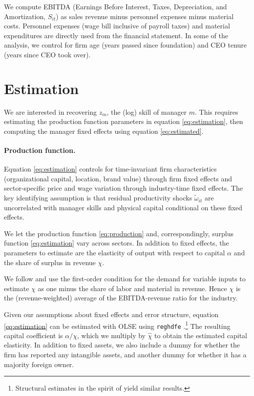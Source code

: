 \documentclass[11pt,a4paper]{article}
\begin{document}
We compute EBITDA (Earnings Before Interest, Taxes, Depreciation, and Amortization, $S_{it}$) as sales revenue minus personnel expenses minus material costs. Personnel expenses (wage bill inclusive of payroll taxes) and material expenditures are directly used from the financial statement. In some of the analysis, we control for firm age (years passed since foundation) and CEO tenure (years since CEO took over).

\section{Estimation}

We are interested in recovering $z_m$, the (log) skill of manager $m$. This requires estimating the production function parameters in equation \eqref{eq:estimation}, then computing the manager fixed effects using equation \eqref{eq:estimated}.

\paragraph{Production function.}
Equation \eqref{eq:estimation} controls for time-invariant firm characteristics (organizational capital, location, brand value) through firm fixed effects and sector-specific price and wage variation through industry-time fixed effects. The key identifying assumption is that residual productivity shocks $\tilde{\omega}_{it}$ are uncorrelated with manager skills and physical capital conditional on these fixed effects.

We let the production function \eqref{eq:production} and, correspondingly, surplus function \eqref{eq:estimation} vary across sectors. In addition to fixed effects, the parameters to estimate are the elasticity of output with respect to capital $\alpha$ and the share of surplus in revenue $\chi$. 

We follow \citet{Gandhi2020-nu} and use the first-order condition for the demand for variable inputs to estimate $\chi$ as one minus the share of labor and material in revenue. Hence $\chi$ is the (revenue-weighted) average of the EBITDA-revenue ratio for the industry.

Given our assumptions about fixed effects and error structure, equation \eqref{eq:estimation} can be estimated with OLSE using \texttt{reghdfe} \citep{reghdfe}.\footnote{Structural estimates in the spirit of \citet{Olley1996-wy} yield similar results.} The resulting capital coefficient is $\alpha/\chi$, which we multiply by $\hat\chi$ to obtain the estimated capital elasticity. In addition to fixed assets, we also include a dummy for whether the firm has reported any intangible assets, and another dummy for whether it has a majority foreign owner.
\end{document}
